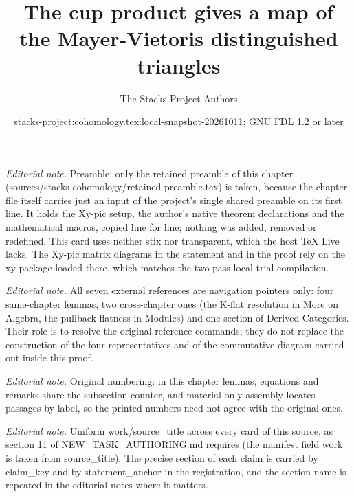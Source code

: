 \documentclass[10pt,a4paper]{amsart}
\title{The cup product gives a map of the Mayer-Vietoris distinguished triangles}
\author{The Stacks Project Authors}
\date{stacks-project:cohomology.tex:local-snapshot-20261011; GNU FDL 1.2 or later}
\theoremstyle{plain}
\theoremstyle{definition}
\theoremstyle{remark}
\numberwithin{equation}{subsection}
\begin{document}
\maketitle
\noindent\textit{Editorial note.} Preamble: only the retained preamble of this chapter (sources/stacks-cohomology/retained-preamble.tex) is taken, because the chapter file itself carries just an input of the project's single shared preamble on its first line. It holds the Xy-pic setup, the author's native theorem declarations and the mathematical macros, copied line for line; nothing was added, removed or redefined. This card uses neither stix nor transparent, which the host TeX Live lacks. The Xy-pic matrix diagrams in the statement and in the proof rely on the xy package loaded there, which matches the two-pass local trial compilation.\par\medskip
\noindent\textit{Editorial note.} All seven external references are navigation pointers only: four same-chapter lemmas, two cross-chapter ones (the K-flat resolution in More on Algebra, the pullback flatness in Modules) and one section of Derived Categories. Their role is to resolve the original reference commands; they do not replace the construction of the four representatives and of the commutative diagram carried out inside this proof.\par\medskip
\noindent\textit{Editorial note.} Original numbering: in this chapter lemmas, equations and remarks share the subsection counter, and material-only assembly locates passages by label, so the printed numbers need not agree with the original ones.\par\medskip
\noindent\textit{Editorial note.} Uniform work/source\_title across every card of this source, as section 11 of NEW\_TASK\_AUTHORING.md requires (the manifest field work is taken from source\_title). The precise section of each claim is carried by claim\_key and by statement\_anchor in the registration, and the section name is repeated in the editorial notes where it matters.\par\medskip
\end{document}
